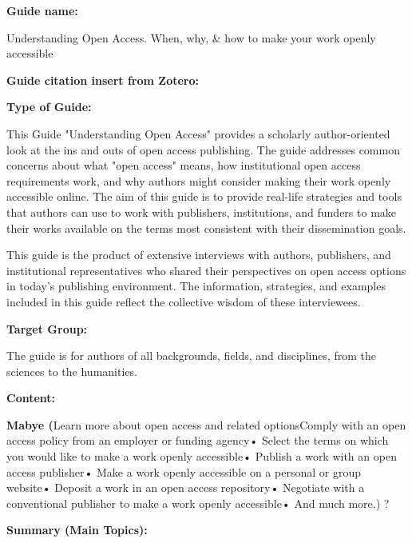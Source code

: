 \documentclass{article}
\begin{document}
\textbf{Guide name:} 

Understanding Open Access. When, why, \& how to make your work openly accessible


\textbf{Guide citation insert from Zotero:} 

\autocite{rubow_understanding_2015}


\textbf{Type of Guide:}

This Guide "Understanding Open Access" provides a scholarly author-oriented look at the ins and outs of open access publishing. The guide addresses common concerns about what "open access" means, how institutional open access requirements work, and why authors might consider making their work openly accessible online. The aim of this guide is to provide real-life strategies and tools that authors can use to work with publishers, institutions, and funders to make their works available on the terms most consistent with their dissemination goals.


This guide is the product of extensive interviews with authors, publishers, and institutional representatives who shared their perspectives on open access options in today’s publishing environment. The information, strategies, and examples included in this guide reflect the collective wisdom of these interviewees.


\textbf{Target Group:}

The guide is for authors of all backgrounds, fields, and disciplines, from the sciences to the humanities.


\textbf{Content:}

\textbf{Mabye (}Learn more about open access and related optionsComply with an open access policy from an employer or funding agency• Select the terms on which you would like to make a work openly accessible• Publish a work with an open access publisher• Make a work openly accessible on a personal or group website• Deposit a work in an open access repository• Negotiate with a conventional publisher to make a work openly accessible• And much more.) ?




\textbf{Summary (Main Topics):}














\printbibliography[title={Literaturverzeichnis}]
\end{document}
